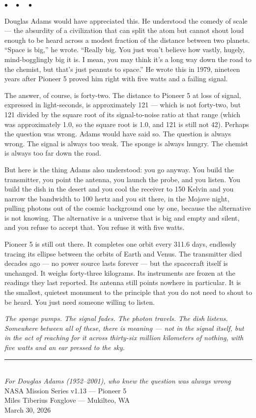 \documentclass[12pt, letterpaper]{article}
\begin{document}
\begin{center}
$\bullet\quad\bullet\quad\bullet$
\end{center}

Douglas Adams would have appreciated this. He understood the comedy of scale --- the absurdity of a civilization that can split the atom but cannot shout loud enough to be heard across a modest fraction of the distance between two planets. ``Space is big,'' he wrote. ``Really big. You just won't believe how vastly, hugely, mind-bogglingly big it is. I mean, you may think it's a long way down the road to the chemist, but that's just peanuts to space.'' He wrote this in 1979, nineteen years after Pioneer 5 proved him right with five watts and a failing signal.

The answer, of course, is forty-two. The distance to Pioneer 5 at loss of signal, expressed in light-seconds, is approximately 121 --- which is not forty-two, but 121 divided by the square root of its signal-to-noise ratio at that range (which was approximately 1.0, so the square root is 1.0, and 121 is still not 42). Perhaps the question was wrong. Adams would have said so. The question is always wrong. The signal is always too weak. The sponge is always hungry. The chemist is always too far down the road.

But here is the thing Adams also understood: you go anyway. You build the transmitter, you point the antenna, you launch the probe, and you listen. You build the dish in the desert and you cool the receiver to 150 Kelvin and you narrow the bandwidth to 100 hertz and you sit there, in the Mojave night, pulling photons out of the cosmic background one by one, because the alternative is not knowing. The alternative is a universe that is big and empty and silent, and you refuse to accept that. You refuse it with five watts.

Pioneer 5 is still out there. It completes one orbit every 311.6 days, endlessly tracing its ellipse between the orbits of Earth and Venus. The transmitter died decades ago --- no power source lasts forever --- but the spacecraft itself is unchanged. It weighs forty-three kilograms. Its instruments are frozen at the readings they last reported. Its antenna still points nowhere in particular. It is the smallest, quietest monument to the principle that you do not need to shout to be heard. You just need someone willing to listen.

\vspace{1em}
\noindent\textit{The sponge pumps. The signal fades. The photon travels. The dish listens. Somewhere between all of these, there is meaning --- not in the signal itself, but in the act of reaching for it across thirty-six million kilometers of nothing, with five watts and an ear pressed to the sky.}

\vspace{2em}
\begin{center}
\rule{0.3\textwidth}{0.4pt}\\[1em]
\textit{For Douglas Adams (1952--2001), who knew the question was always wrong}\\[0.5em]
\small NASA Mission Series v1.13 --- Pioneer 5\\
\small Miles Tiberius Foxglove --- Mukilteo, WA\\
\small March 30, 2026
\end{center}
\end{document}
